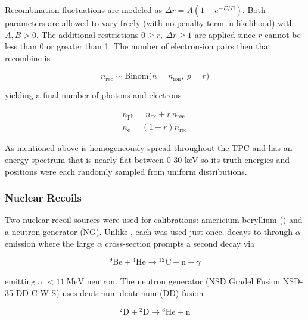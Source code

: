 Recombination fluctuations are modeled as $\Delta r = A(1 - e^{-E/B})$.  Both parameters are allowed
to vary freely (with no penalty term in likelihood) with $A,B > 0$.  The additional
restrictions $0 \geq r,\ \Delta r \geq 1$ are applied since $r$ cannot be less than 0 or greater than 1.  The number of electron-ion pairs
then that recombine is

\begin{equation}
n_{\mathrm{rec}} \sim \mathrm{Binom} \big(n = n_{\mathrm{ion}},\ p = r \big)
\end{equation}

\noindent yielding a final number of photons and electrons

\begin{equation}
\begin{aligned}
n_{\mathrm{ph}} = n_{\mathrm{ex}} + r\, n_{\mathrm{rec}} \\
n_{\mathrm{e}} = (1 - r) n_{\mathrm{rec}}
\end{aligned}
\end{equation}

\noindent  As mentioned above  is homogeneously spread throughout the TPC and has an energy spectrum that is nearly flat
between 0-30 keV so its truth energies and positions were each randomly sampled from uniform distributions.



\subsubsection{Nuclear Recoils}
\label{subsubsec:er_nr_calibrations_parameter_determ_nr}
Two nuclear recoil sources were used for calibrations: americium beryllium (\ambe) and a neutron generator (NG).  Unlike ,
each was used just once.  \ambe decays to  through $\alpha$-emission where the large  $\alpha$ cross-section
prompts a second decay via

\begin{equation}
\mathrm{^{9}Be} + \mathrm{^{4}He} \rightarrow \mathrm{^{12}C + n} + \gamma
\end{equation}

\noindent emitting a $< 11\ \mathrm{MeV}$ neutron.  The neutron generator (NSD Gradel Fusion NSD-35-DD-C-W-S) uses
deuterium-deuterium (DD) fusion

\begin{equation}
\mathrm{^{2}D} + \mathrm{^{2}D} \rightarrow \mathrm{^{3}He} + \mathrm{n}
\end{equation}

